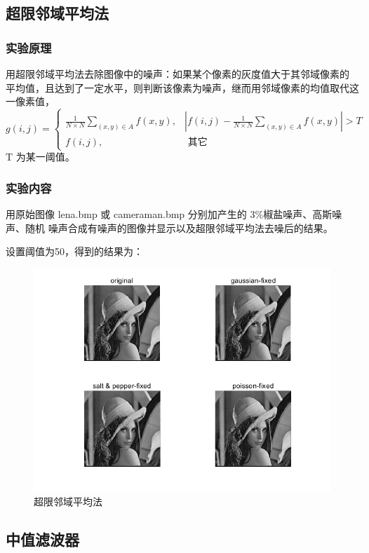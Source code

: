 \documentclass{ctexart}
\begin{document}
\subsection{\hei 超限邻域平均法}
\subsubsection{\hei 实验原理}
用超限邻域平均法去除图像中的噪声：如果某个像素的灰度值大于其邻域像素的
平均值，且达到了一定水平，则判断该像素为噪声，继而用邻域像素的均值取代这
一像素值，
$$
    g(i, j)=\left\{\begin{array}{ll}
        \frac{1}{N \times N} \sum_{(x, y) \in A} f(x, y), & \left|f(i, j)-\frac{1}{N \times N} \sum_{(x, y) \in A} f(x, y)\right|>T \\
        f(i, j),                                          & \text { 其它 }
    \end{array}\right.
$$
$\mathrm{T}$ 为某一阈值。
\subsubsection{\hei 实验内容}
用原始图像 lena.bmp 或 cameraman.bmp 分别加产生的 3\%椒盐噪声、高斯噪声、随机
噪声合成有噪声的图像并显示以及超限邻域平均法去噪后的结果。
\par 设置阈值为50，得到的结果为：
\begin{figure}[H]
    \centering
    \includegraphics[scale=0.35]{3_2.png}
    \caption{超限邻域平均法}
\end{figure}
\subsection{\hei 中值滤波器}
\end{document}
